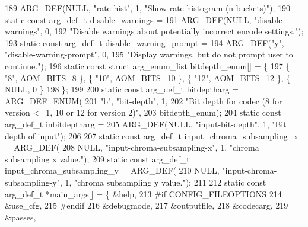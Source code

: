 \begin{DoxyCodeInclude}
{{189     ARG\_DEF(NULL, \textcolor{stringliteral}{"rate-hist"}, 1, \textcolor{stringliteral}{"Show rate histogram (n-buckets)"});
190 \textcolor{keyword}{static} \textcolor{keyword}{const} arg\_def\_t disable\_warnings =
191     ARG\_DEF(NULL, \textcolor{stringliteral}{"disable-warnings"}, 0,
192         \textcolor{stringliteral}{"Disable warnings about potentially incorrect encode settings."});
193 \textcolor{keyword}{static} \textcolor{keyword}{const} arg\_def\_t disable\_warning\_prompt =
194     ARG\_DEF(\textcolor{stringliteral}{"y"}, \textcolor{stringliteral}{"disable-warning-prompt"}, 0,
195         \textcolor{stringliteral}{"Display warnings, but do not prompt user to continue."});
196 \textcolor{keyword}{static} \textcolor{keyword}{const} \textcolor{keyword}{struct }arg\_enum\_list bitdepth\_enum[] = \{
197     \{ \textcolor{stringliteral}{"8"}, \hyperlink{group__codec_gga6ed0e98eba4651c1ad845e39498e4153a4c7f55539160206a3fbb2a6cfc9ef89c}{AOM\_BITS\_8} \}, \{ \textcolor{stringliteral}{"10"}, \hyperlink{group__codec_gga6ed0e98eba4651c1ad845e39498e4153a91734384f432233c3d681052122ab8e7}{AOM\_BITS\_10} \}, \{ \textcolor{stringliteral}{"12"}, 
      \hyperlink{group__codec_gga6ed0e98eba4651c1ad845e39498e4153a15836a87f9e9940885d5ef59a52bf728}{AOM\_BITS\_12} \}, \{ NULL, 0 \}
198 \};
199 
200 \textcolor{keyword}{static} \textcolor{keyword}{const} arg\_def\_t bitdeptharg = ARG\_DEF\_ENUM(
201     \textcolor{stringliteral}{"b"}, \textcolor{stringliteral}{"bit-depth"}, 1,
202     \textcolor{stringliteral}{"Bit depth for codec (8 for version <=1, 10 or 12 for version 2)"},
203     bitdepth\_enum);
204 \textcolor{keyword}{static} \textcolor{keyword}{const} arg\_def\_t inbitdeptharg =
205     ARG\_DEF(NULL, \textcolor{stringliteral}{"input-bit-depth"}, 1, \textcolor{stringliteral}{"Bit depth of input"});
206 
207 \textcolor{keyword}{static} \textcolor{keyword}{const} arg\_def\_t input\_chroma\_subsampling\_x = ARG\_DEF(
208     NULL, \textcolor{stringliteral}{"input-chroma-subsampling-x"}, 1, \textcolor{stringliteral}{"chroma subsampling x value."});
209 \textcolor{keyword}{static} \textcolor{keyword}{const} arg\_def\_t input\_chroma\_subsampling\_y = ARG\_DEF(
210     NULL, \textcolor{stringliteral}{"input-chroma-subsampling-y"}, 1, \textcolor{stringliteral}{"chroma subsampling y value."});
211 
212 \textcolor{keyword}{static} \textcolor{keyword}{const} arg\_def\_t *main\_args[] = \{ &help,
213 \textcolor{preprocessor}{#if CONFIG\_FILEOPTIONS}
214     &use\_cfg,
215 \textcolor{preprocessor}{#endif}
216     &debugmode,
217     &outputfile,
218     &codecarg,
219     &passes,
}}
\end{DoxyCodeInclude}
